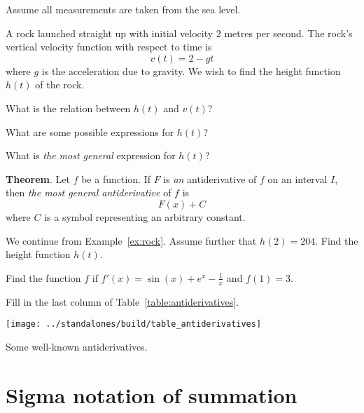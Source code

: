 \documentclass[../main.tex]{subfiles}
\begin{document}
\clearpage
\begin{example} \label{ex:rock}
Assume all measurements are taken from the sea level.

A rock launched straight up with initial velocity \(2\) metres per second. The rock's vertical velocity function with respect to time is
\[
  v(t) = 2 - gt
\]
where \(g\) is the acceleration due to gravity.  We wish to find the height function \(h(t)\) of the rock. 

\faComment{} What is the relation between \(h(t)\) and \(v(t)\)?
\vspace{1in}

\faComment{} What are some possible expressions for \(h(t)\)?
\vspace{2in}

\faComment{} What is \emph{the most general} expression for \(h(t)\)?
\vspace{1in}
  
\end{example}
\begin{mdframed}[style=withref]
  \textbf{Theorem}. Let \(f\) be a function. If \(F\) is \emph{an} antiderivative of \(f\) on an interval \(I\), then \emph{the most general antiderivative} of \(f\) is
  \[
    F(x) + C
  \]
  where \(C\) is a symbol representing an arbitrary constant.

\end{mdframed}
\clearpage

\begin{example}
  We continue from Example~\ref{ex:rock}. Assume further that \(h(2) = 204\). Find the height function \(h(t)\).
\end{example}
\vspace{3in}

\begin{example}
  Find the function \(f\) if \(f'(x) = \sin(x) + e^{x} - \frac{1}{x}\) and \(f(1) = 3\).
\end{example}
\clearpage


Fill in the last column of Table~\ref{table:antiderivatives}.
\bigskip
\begin{table}[h!]
  \centering
  \texttt{[image: ../standalones/build/table\_antiderivatives]}
  \caption{Some well-known antiderivatives.}
  \label{table:antiderivatives}
\end{table}

\clearpage

\section{Sigma notation of summation}
\end{document}
